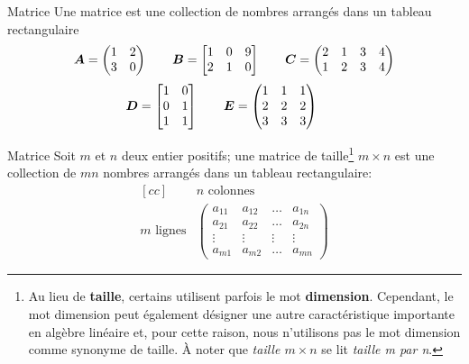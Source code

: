 \documentclass[french]{beamer}
\begin{document}
	\begin{frame}{Matrice}
	Une matrice est une collection de nombres arrangés dans un tableau rectangulaire
		\[
\boldsymbol{A} = \begin{pmatrix}
1 & 2 \\
3 & 0 
\end{pmatrix} \qquad 
\boldsymbol{B} = \begin{bmatrix}
1 & 0 & 9 \\
2 & 1 & 0 
\end{bmatrix} \qquad
\boldsymbol{C} = \begin{pmatrix}
2 & 1 & 3 & 4\\
1 & 2 & 3 & 4
\end{pmatrix} \]
\[
\boldsymbol{D} = \begin{bmatrix}
1 & 0  \\
0 & 1  \\
1 & 1
\end{bmatrix} \qquad
\boldsymbol{E} = \begin{pmatrix}
1 & 1 & 1 \\
2 & 2 & 2 \\
3 & 3 & 3
\end{pmatrix} \qquad
	\]
\end{frame}		
	
	\begin{frame}{Matrice}
	Soit $m$ et $n$ deux entier positifs; une matrice de taille\footnote{Au lieu de \textbf{taille}, 
		certains utilisent parfois le mot \textbf{dimension}.  
		Cependant, le mot dimension peut également désigner une autre caractéristique importante en algèbre linéaire et,
		pour cette raison, nous n'utilisons pas le mot dimension comme synonyme de taille. 
		À noter que \textit{taille $m\times n$} se lit \textit{taille m par n}.} $m\times n$
	est une collection de $mn$ nombres arrangés dans un tableau rectangulaire:
\[
\begin{matrix}[cc]
&\text{$n$ colonnes} \\
\text{$m$ lignes}& \begin{pmatrix}
a_{11} & a_{12} & \ldots & a_{1n}\\
a_{21} & a_{22} & \ldots & a_{2n}\\
\vdots & \vdots & \vdots & \vdots \\
a_{m1} & a_{m2} & \ldots & a_{mn}
\end{pmatrix}
\end{matrix}
\]
	\end{frame}
	
\end{document}
